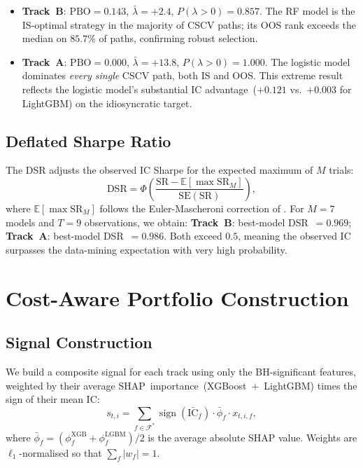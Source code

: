 \documentclass[journal]{IEEEtran}
\newcommand{\E}{\mathbb{E}}
\newcommand{\IC}{\mathrm{IC}}
\newcommand{\PBO}{\mathrm{PBO}}
\newcommand{\DSR}{\mathrm{DSR}}
\newcommand{\SR}{\mathrm{SR}}
\begin{document}
\begin{itemize}
  \item \textbf{Track~B}: $\PBO = 0.143$, $\bar\lambda = {+}2.4$,
        $P(\lambda>0) = 0.857$.
        The RF model is the IS-optimal strategy in the majority of
        CSCV paths; its OOS rank exceeds the median on $85.7\%$ of
        paths, confirming robust selection.
  \item \textbf{Track~A}: $\PBO = 0.000$, $\bar\lambda = {+}13.8$,
        $P(\lambda>0) = 1.000$.
        The logistic model dominates \emph{every single} CSCV path,
        both IS and OOS.
        This extreme result reflects the logistic model's substantial
        IC advantage~($+0.121$ vs.\ $+0.003$ for LightGBM) on the
        idiosyncratic target.
\end{itemize}

\subsection{Deflated Sharpe Ratio}
The DSR adjusts the observed IC Sharpe for the expected maximum of
$M$ trials:
\begin{equation}
  \DSR = \Phi\!\left(\frac{\SR - \E[\max \SR_M]}{\mathrm{SE}(\SR)}\right),
  \label{eq:dsr}
\end{equation}
where $\E[\max \SR_M]$ follows the Euler-Mascheroni correction of
\citet{bailey2014deflated}.
For $M=7$ models and $T=9$ observations, we obtain:
\textbf{Track~B}: best-model DSR~$= 0.969$;
\textbf{Track~A}: best-model DSR~$= 0.986$.
Both exceed $0.5$, meaning the observed IC surpasses the
data-mining expectation with very high probability.

\section{Cost-Aware Portfolio Construction}
\label{sec:backtest}

\subsection{Signal Construction}
We build a composite signal for each track using only the
BH-significant features, weighted by their average
SHAP~importance~(XGBoost~$+$~LightGBM) times the sign of their
mean IC:
\begin{equation}
  s_{t,i} = \sum_{f \in \mathcal{F}^*}
             \operatorname{sign}(\bar{\IC}_f)
             \cdot \bar{\phi}_f \cdot x_{t,i,f},
  \label{eq:signal}
\end{equation}
where $\bar\phi_f = (\phi_f^\text{XGB} + \phi_f^\text{LGBM})/2$ is
the average absolute SHAP value.
Weights are $\ell_1$-normalised so that $\sum_f |w_f| = 1$.
\end{document}
